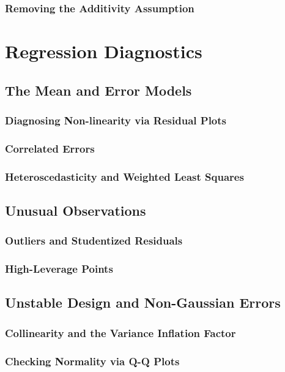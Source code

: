 \subsubsection{Removing the Additivity Assumption}

\section{Regression Diagnostics}

\subsection{The Mean and Error Models}

\subsubsection{Diagnosing Non-linearity via Residual Plots}

\subsubsection{Correlated Errors}

\subsubsection{Heteroscedasticity and Weighted Least Squares}

\subsection{Unusual Observations}

\subsubsection{Outliers and Studentized Residuals}

\subsubsection{High-Leverage Points}

\subsection{Unstable Design and Non-Gaussian Errors}

\subsubsection{Collinearity and the Variance Inflation Factor}

\subsubsection{Checking Normality via Q-Q Plots}